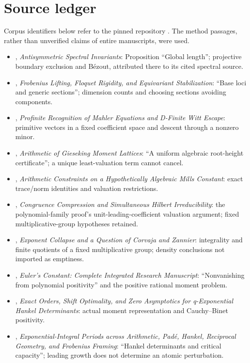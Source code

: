 \documentclass[11pt,a4paper,oneside]{report}
\theoremstyle{definition}
\theoremstyle{remark}
\begin{document}
\section{Source ledger}
Corpus identifiers below refer to the pinned repository \cite{B:Corpus}. The method passages, rather than unverified claims of entire manuscripts, were used.
\begin{itemize}[itemsep=0.5pt,topsep=3pt]
\item [069], \emph{Antisymmetric Spectral Invariants}: Proposition ``Global length''; projective boundary exclusion and B\'ezout, attributed there to its cited spectral source.
\item [070], \emph{Frobenius Lifting, Floquet Rigidity, and Equivariant Stabilization}: ``Base loci and generic sections''; dimension counts and choosing sections avoiding components.
\item [013], \emph{Profinite Recognition of Mahler Equations and D-Finite Witt Escape}: primitive vectors in a fixed coefficient space and descent through a nonzero minor.
\item [045], \emph{Arithmetic of Gieseking Moment Lattices}: ``A uniform algebraic root-height certificate''; a unique least-valuation term cannot cancel.
\item [010], \emph{Arithmetic Constraints on a Hypothetically Algebraic Mills Constant}: exact trace/norm identities and valuation restrictions.
\item [089], \emph{Congruence Compression and Simultaneous Hilbert Irreducibility}: the polynomial-family proof's unit-leading-coefficient valuation argument; fixed multiplicative-group hypotheses retained.
\item [060], \emph{Exponent Collapse and a Question of Corvaja and Zannier}: integrality and finite quotients of a fixed multiplicative group; density conclusions not imported as emptiness.
\item [019], \emph{Euler's Constant: Complete Integrated Research Manuscript}: ``Nonvanishing from polynomial positivity'' and the positive rational moment problem.
\item [026], \emph{Exact Orders, Shift Optimality, and Zero Asymptotics for q-Exponential Hankel Determinants}: actual moment representation and Cauchy--Binet positivity.
\item [001], \emph{Exponential-Integral Periods across Arithmetic, Pad\'e, Hankel, Reciprocal Geometry, and Frobenius Framing}: ``Hankel determinants and critical capacity''; leading growth does not determine an atomic perturbation.

\end{itemize}
\end{document}
